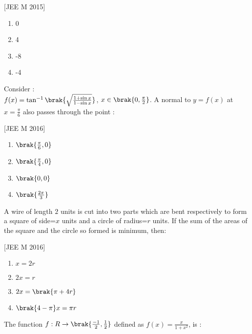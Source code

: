     \hfill[JEE M 2015]\\
\begin{enumerate}
    \item  0\\
    \item  4\\
    \item -8\\
    \item -4\\
\end{enumerate}    
\item Consider $:$\\
     $f(x)=\tan^{-1}\brak{ \sqrt{\frac{1+\sin{x}}{1-\sin{x}} }}$, $x \in \brak{0, \frac{\pi}{2}}$. 
A normal to $y=f(x)$ at $x=\frac{\pi}{6}$ also passes through the point :

\hfill[JEE M 2016]\\
\begin{enumerate}
    \item  $\brak{\frac{\pi}{6},0}$\\
    \item  $\brak{\frac{\pi}{4},0}$\\
    \item  $\brak{0,0}$\\
    \item  $\brak{\frac{2\pi}{3}}$\\
\end{enumerate}
\item A wire of length $2$ units is cut into two parts which are bent respectively to form a square of side=$x$ units and a circle of radius=$r$ units. If the sum of the areas of the square and the circle so formed is minimum, then:

\hfill[JEE M 2016]\\
\begin{enumerate}
    \item  $x=2r$\\
    \item  $2x=r$\\
    \item  $2x=\brak{\pi+4r}$\\
    \item  $\brak{4-\pi}x=\pi r$\\
\end{enumerate}
\item The function $f : R\rightarrow {\brak{\frac{-1}{2}, \frac{1}{2}}}$ defined as $f(x)=\frac{x}{1+x^2}$, is :

